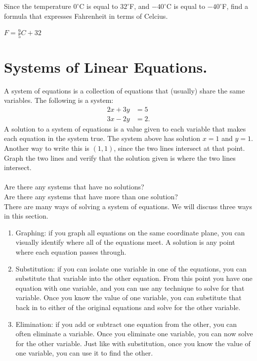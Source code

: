 \documentclass[12pt,fleqn]{book}
\newcommand{\prb}[1]{\begin{Exercise}#1\end{Exercise}}
\newcommand{\sol}[1]{\begin{Answer}#1\end{Answer}}
\begin{document}
\prb{
	Since the temperature $0^\circ$C is equal to $32^\circ$F, and $-40^\circ$C is equal to $-40^\circ$F, find a formula that expresses Fahrenheit in terms of Celcius.
	\vspace{4em}
}
\sol{$F=\frac{9}{5}C+32$}

\clearpage

\chapter{Systems of Linear Equations.}
A system of equations is a collection of equations that (usually) share the same variables.  The following is a system:
\begin{align*}
    2x+3y&=5\\
    3x-2y&=2.
\end{align*}
A solution to a system of equations is a value given to each variable that makes each equation in the system true.  The system above has solution $x=1$ and $y=1$.  Another way to write this is $(1,1)$, since the two lines intersect at that point.
\\[1em]
Graph the two lines and verify that the solution given is where the two lines intersect.
\\[1em]
\\[1em]
Are there any systems that have no solutions?
\\[5em]
Are there any systems that have more than one solution?
\\[5em]
There are many ways of solving a system of equations.  We will discuss three ways in this section.
\begin{enumerate}
  \item Graphing: if you graph all equations on the same coordinate plane, you can visually identify where all of the equations meet.  A solution is any point where each equation passes through.
  \item Substitution: if you can isolate one variable in one of the equations, you can substitute that variable into the other equation.  From this point you have one equation with one variable, and you can use any technique to solve for that variable.  Once you know the value of one variable, you can substitute that back in to either of the original equations and solve for the other variable.
  \item Elimination: if you add or subtract one equation from the other, you can often eliminate a variable.  Once you eliminate one variable, you can now solve for the other variable.  Just like with substitution, once you know the value of one variable, you can use it to find the other.
\end{enumerate}
\end{document}
